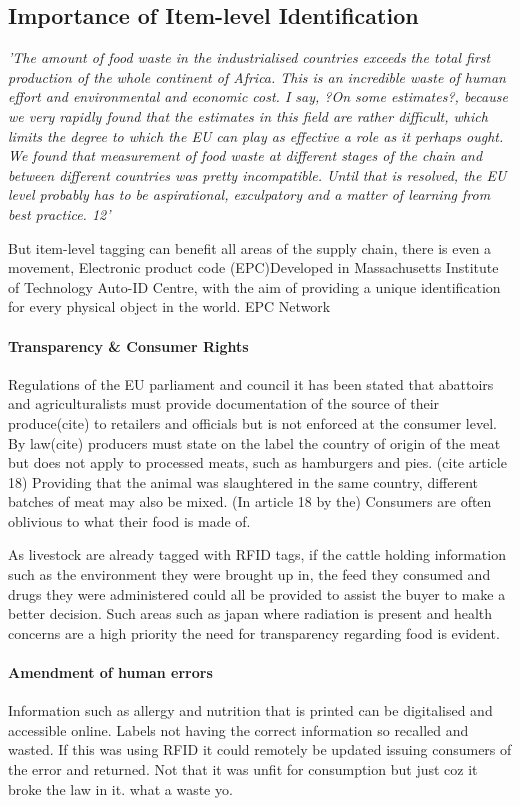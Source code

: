 \documentclass[a4paper, 11pt]{article}
\begin{document}
\subsection{Importance of Item-level Identification}
\emph{'The amount of food waste in the industrialised countries exceeds the total first
production of the whole continent of Africa. This is an incredible waste of human effort
and environmental and economic cost. I say, ?On some estimates?, because we very
rapidly found that the estimates in this field are rather difficult, which limits the degree
to which the EU can play as effective a role as it perhaps ought. We found that
measurement of food waste at different stages of the chain and between different
countries was pretty incompatible. Until that is resolved, the EU level probably has to
be aspirational, exculpatory and a matter of learning from best practice. 12'}

But item-level tagging can benefit all areas of the supply chain, there is even a movement, Electronic product code (EPC)Developed in Massachusetts Institute of Technology Auto-ID Centre, with the aim of providing a unique identification for every physical object in the world. EPC Network

\paragraph{Transparency \& Consumer Rights}
Regulations of the EU parliament and council it has been stated that abattoirs and agriculturalists must provide documentation of the source of their produce(cite) to retailers and officials but is not enforced at the consumer level. By law(cite) producers must state on the label the country of origin of the meat but does not apply to processed meats, such as hamburgers and pies. (cite article 18) Providing that the animal was slaughtered in the same country, different batches of meat may also be mixed. (In article 18 by the) Consumers are often oblivious to what their food is made of. 

As livestock are already tagged with RFID tags, if the cattle holding information such as the environment they were brought up in, the feed they consumed and drugs they were administered could all be provided to assist the buyer to make a better decision. Such areas such as japan where radiation is present and health concerns are a high priority the need for transparency regarding food is evident.  

\paragraph{Amendment of human errors}
Information such as allergy and nutrition that is printed can be digitalised and accessible online. Labels not having the correct information so recalled and wasted. If this was using RFID it could remotely be updated issuing consumers of the error and returned. Not that it was unfit for consumption but just coz it broke the law in it. what a waste yo.
\end{document}
